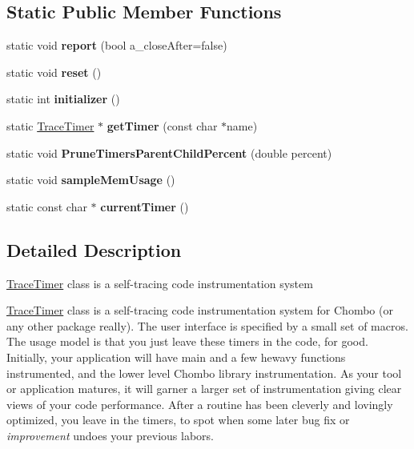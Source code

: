 \subsection*{Static Public Member Functions}
\begin{DoxyCompactItemize}
\item 
\mbox{\label{class_trace_timer_a099a00979dce21aa8152189caa9e3664}} 
static void {\bfseries report} (bool a\+\_\+close\+After=false)
\item 
\mbox{\label{class_trace_timer_a9c51438e2ce920545955f6b03d1959aa}} 
static void {\bfseries reset} ()
\item 
\mbox{\label{class_trace_timer_ad2418f864f19ff1af50a7dd86d1ac572}} 
static int {\bfseries initializer} ()
\item 
\mbox{\label{class_trace_timer_a2f3e79338d3f21acc37bcf9a12cc67ae}} 
static \hyperlink{class_trace_timer}{Trace\+Timer} $\ast$ {\bfseries get\+Timer} (const char $\ast$name)
\item 
\mbox{\label{class_trace_timer_a5195aa7537a7db853ce2ec8259ad5755}} 
static void {\bfseries Prune\+Timers\+Parent\+Child\+Percent} (double percent)
\item 
\mbox{\label{class_trace_timer_af57bb1e97bf05e30a71b09c68bd14370}} 
static void {\bfseries sample\+Mem\+Usage} ()
\item 
\mbox{\label{class_trace_timer_a4360f840af3e64a931860d64fb35569f}} 
static const char $\ast$ {\bfseries current\+Timer} ()
\end{DoxyCompactItemize}


\subsection{Detailed Description}
\hyperlink{class_trace_timer}{Trace\+Timer} class is a self-\/tracing code instrumentation system

\hyperlink{class_trace_timer}{Trace\+Timer} class is a self-\/tracing code instrumentation system for Chombo (or any other package really). The user interface is specified by a small set of macros. The usage model is that you just leave these timers in the code, for good. Initially, your application will have \textquotesingle{}main\textquotesingle{} and a few hewavy functions instrumented, and the lower level Chombo library instrumentation. As your tool or application matures, it will garner a larger set of instrumentation giving clear views of your code performance. After a routine has been cleverly and lovingly optimized, you leave in the timers, to spot when some later bug fix or {\itshape improvement} undoes your previous labors.

